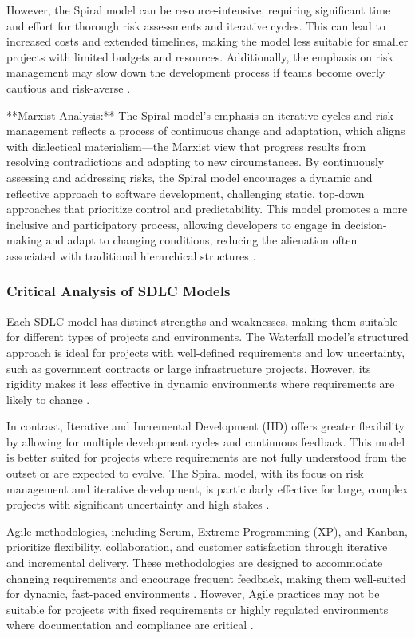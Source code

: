 \begin{refsection}
However, the Spiral model can be resource-intensive, requiring significant time and effort for thorough risk assessments and iterative cycles. This can lead to increased costs and extended timelines, making the model less suitable for smaller projects with limited budgets and resources. Additionally, the emphasis on risk management may slow down the development process if teams become overly cautious and risk-averse \cite[pp.~61-72]{boehm1988spiral}.

**Marxist Analysis:** The Spiral model’s emphasis on iterative cycles and risk management reflects a process of continuous change and adaptation, which aligns with dialectical materialism—the Marxist view that progress results from resolving contradictions and adapting to new circumstances. By continuously assessing and addressing risks, the Spiral model encourages a dynamic and reflective approach to software development, challenging static, top-down approaches that prioritize control and predictability. This model promotes a more inclusive and participatory process, allowing developers to engage in decision-making and adapt to changing conditions, reducing the alienation often associated with traditional hierarchical structures \cite[pp.~18-40]{braverman1998labor}.

\subsubsection{Critical Analysis of SDLC Models}

Each SDLC model has distinct strengths and weaknesses, making them suitable for different types of projects and environments. The Waterfall model's structured approach is ideal for projects with well-defined requirements and low uncertainty, such as government contracts or large infrastructure projects. However, its rigidity makes it less effective in dynamic environments where requirements are likely to change \cite[pp.~329-341]{royce1987managing}.

In contrast, Iterative and Incremental Development (IID) offers greater flexibility by allowing for multiple development cycles and continuous feedback. This model is better suited for projects where requirements are not fully understood from the outset or are expected to evolve. The Spiral model, with its focus on risk management and iterative development, is particularly effective for large, complex projects with significant uncertainty and high stakes \cite[pp.~61-72]{boehm1988spiral}.

Agile methodologies, including Scrum, Extreme Programming (XP), and Kanban, prioritize flexibility, collaboration, and customer satisfaction through iterative and incremental delivery. These methodologies are designed to accommodate changing requirements and encourage frequent feedback, making them well-suited for dynamic, fast-paced environments \cite[pp.~55-75]{schwaber2007agile}. However, Agile practices may not be suitable for projects with fixed requirements or highly regulated environments where documentation and compliance are critical \cite[pp.~55-75]{beck2021extreme}.


\end{refsection}
